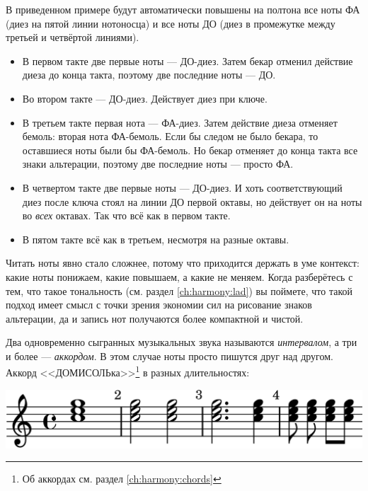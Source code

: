 В приведенном примере будут автоматически повышены на полтона все ноты ФА (диез на пятой линии нотоносца) и все ноты ДО (диез в промежутке между третьей и четвёртой линиями).
\begin{itemize}
    \item В первом такте две первые ноты --- ДО-диез. Затем бекар отменил действие диеза до конца такта, поэтому две последние ноты --- ДО.
    
    \item Во втором такте --- ДО-диез. Действует диез при ключе.
    
    \item В третьем такте первая нота --- ФА-диез. Затем действие диеза отменяет бемоль: вторая нота ФА-бемоль. Если бы следом не было бекара, то оставшиеся ноты были бы ФА-бемоль. Но бекар отменяет до конца такта все знаки альтерации, поэтому две последние ноты --- просто ФА.
    
    \item В четвертом такте две первые ноты --- ДО-диез. И хоть соответствующий диез после ключа стоял на линии ДО первой октавы, но действует он на ноты во \emph{всех} октавах. Так что всё как в первом такте.
    
    \item В пятом такте всё как в третьем, несмотря на разные октавы.
\end{itemize}

Читать ноты явно стало сложнее, потому что приходится держать в уме контекст: какие ноты понижаем, какие повышаем, а какие не меняем. Когда разберётесь с тем, что такое тональность (см. раздел \ref{ch:harmony:lad}) вы поймете, что такой подход имеет смысл с точки зрения экономии сил на рисование знаков альтерации, да и запись нот получаются более компактной и чистой.

Два одновременно сыгранных музыкальных звука называются \emph{интервалом}, а три и более --- \emph{аккордом}. В этом случае ноты просто пишутся друг над другом. Аккорд <<ДОМИСОЛЬка>>\footnote{Об аккордах см. раздел \ref{ch:harmony:chords}} в разных длительностях:
\begin{center}
    \includegraphics{fig/notes/chord}
\end{center}

